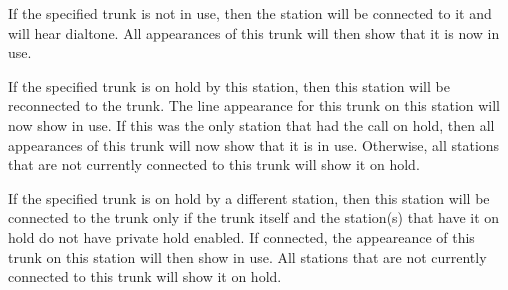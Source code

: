 If the specified trunk is not in use, then the station will be connected to it and
will hear dialtone.  All appearances of this trunk will then show that it
is now in use.

If the specified trunk is on hold by this station, then this station will be
reconnected to the trunk.  The line appearance for this trunk on this station
will now show in use.  If this was the only station that had the call on hold,
then all appearances of this trunk will now show that it is in use.  Otherwise,
all stations that are not currently connected to this trunk will show it
on hold.

If the specified trunk is on hold by a different station, then this station
will be connected to the trunk only if the trunk itself and the station(s) that
have it on hold do not have private hold enabled.  If connected, the appeareance
of this trunk on this station will then show in use.  All stations that are not
currently connected to this trunk will show it on hold.

%

